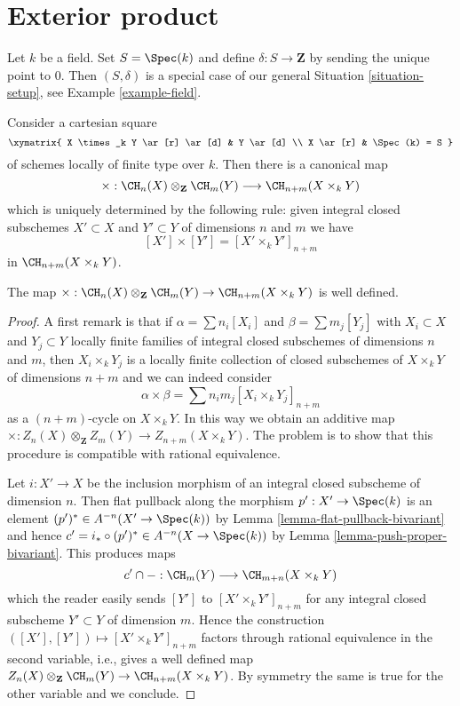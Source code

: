 








\section{Exterior product}
\label{section-exterior-product}

\noindent
Let $k$ be a field. Set $S = \Spec(k)$ and define $\delta : S \to \mathbf{Z}$
by sending the unique point to $0$. Then $(S, \delta)$ is a special case of
our general Situation \ref{situation-setup}, see
Example \ref{example-field}.

\medskip\noindent
Consider a cartesian square
$$
\xymatrix{
X \times_k Y \ar[r] \ar[d] & Y \ar[d] \\
X \ar[r] & \Spec(k) = S
}
$$
of schemes locally of finite type over $k$. Then there is a canonical map
$$
\times :
\CH_n(X) \otimes_{\mathbf{Z}} \CH_m(Y)
\longrightarrow
\CH_{n + m}(X \times_k Y)
$$
which is uniquely determined by the following rule:
given integral closed subschemes $X' \subset X$
and $Y' \subset Y$ of dimensions $n$ and $m$ we have
$$
[X'] \times [Y'] = [X' \times_k Y']_{n + m}
$$
in $\CH_{n + m}(X \times_k Y)$.

\begin{lemma}
\label{lemma-exterior-product-well-defined}
The map
$\times : \CH_n(X) \otimes_{\mathbf{Z}} \CH_m(Y) \to \CH_{n + m}(X \times_k Y)$
is well defined.
\end{lemma}

\begin{proof}
A first remark is that if $\alpha = \sum n_i[X_i]$
and $\beta = \sum m_j[Y_j]$ with $X_i \subset X$ and $Y_j \subset Y$
locally finite families of integral closed subschemes of
dimensions $n$ and $m$, then
$X_i \times_k Y_j$ is a locally finite
collection of closed subschemes of $X \times_k Y$ of
dimensions $n + m$ and we can indeed consider
$$
\alpha \times \beta = \sum n_i m_j [X_i \times_k Y_j]_{n + m}
$$
as a $(n + m)$-cycle on $X \times_k Y$. In this way we obtain an
additive map
$\times : Z_n(X) \otimes_{\mathbf{Z}} Z_m(Y) \to Z_{n + m}(X \times_k Y)$.
The problem is to show that
this procedure is compatible with rational equivalence.

\medskip\noindent
Let $i : X' \to X$ be the inclusion morphism of
an integral closed subscheme of dimension $n$.
Then flat pullback along the morphism $p' : X' \to \Spec(k)$ is an element
$(p')^* \in A^{-n}(X' \to \Spec(k))$ by
Lemma \ref{lemma-flat-pullback-bivariant}
and hence $c' = i_* \circ (p')^* \in A^{-n}(X \to \Spec(k))$ by
Lemma \ref{lemma-push-proper-bivariant}.
This produces maps
$$
c' \cap - : \CH_m(Y) \longrightarrow \CH_{m + n}(X \times_k Y)
$$
which the reader easily sends $[Y']$ to $[X' \times_k Y']_{n + m}$
for any integral closed subscheme $Y' \subset Y$ of dimension
$m$. Hence the construction
$([X'], [Y']) \mapsto [X' \times_k Y']_{n + m}$
factors through rational equivalence in the second variable, i.e.,
gives a well defined map
$Z_n(X) \otimes_{\mathbf{Z}} \CH_m(Y) \to \CH_{n + m}(X \times_k Y)$.
By symmetry the same is true for the other variable and we conclude.
\end{proof}


